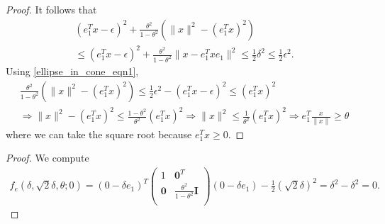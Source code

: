 \begin{proof}
It follows that 
\begin{align*}
(e_1^Tx - \epsilon)^2 + \frac{\theta^2}{1 - \theta^2}\left(\|x\|^2 - (e_1^Tx)^2\right)  \\
\le (e_1^Tx - \epsilon)^2 + \frac{\theta^2}{1 - \theta^2}\|x - e_1^Tx e_1\|^2 \le \frac 1 2 \delta^2 \le \frac 1 2 \epsilon^2.
\end{align*}
Using \cref{ellipse_in_cone_eqn1}, 
\begin{align*}
\frac{\theta^2}{1 - \theta^2}(\|x\|^2 - (e_1^Tx)^2) \le \frac 1 2 \epsilon^2 - (e_1^Tx - \epsilon)^2 \le (e_1^Tx)^2 \\
\Longrightarrow \|x\|^2 - (e_1^Tx)^2 \le \frac{1 - \theta^2}{\theta^2}(e_1^Tx)^2 
\Longrightarrow \|x\|^2 \le \frac 1 {\theta^2}(e_1^Tx)^2
\Longrightarrow e_1^T\frac{x}{\|x\|} \ge \theta
\end{align*}
where we can take the square root because $e_1^Tx \ge 0$.
\end{proof}

\begin{proof}

We compute
\begin{align*}
f_e(\delta, \sqrt{2}\delta, \theta; 0) =(0 - \delta e_1)^T\begin{pmatrix}
1 & \boldsymbol0^T \\
\boldsymbol 0 & \frac{\theta^2}{1 - \theta^2} \boldsymbol I \\
\end{pmatrix}(0 - \delta e_1) - \frac 1 2 (\sqrt 2 \delta)^2
=\delta^2 - \delta^2 = 0.
\end{align*}
\end{proof}


